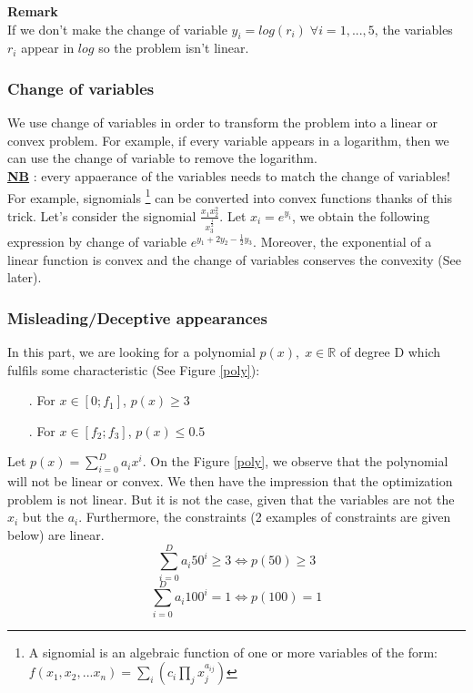 \documentclass{article}
\begin{document}
\textbf{Remark}\\
If we don't make the change of variable $y_i = log(r_i) \; \forall i=1,...,5$,  the variables $r_i$ appear in $log$ so the problem isn't linear.

\subsubsection{Change of variables}

We use change of variables in order to transform the problem into a linear or convex problem. For example, if every variable appears in a logarithm, then we can use the change of variable to remove the logarithm.\\ \underline{\textbf{NB}} : every appaerance of the variables needs to match the change of variables! \\

For example, signomials \footnote{A signomial is an algebraic function of one or more variables of the form:\\ $f(x_1,x_2,...x_n) = \sum_i{(c_i\prod_j{x_j^{a_{ij}}})}$} can be converted into convex functions thanks of this trick. Let's consider the signomial $\frac{x_1x_2^2}{x_3^{\frac{1}{2}}}$. Let $x_i = e^{y_i}$, we obtain the following expression by change of variable $e^{y_1+2y_2-\frac{1}{2}y_3}$. Moreover, the exponential of a linear function is convex and the change of variables conserves the convexity (See later).

\subsubsection{Misleading/Deceptive appearances}

In this part, we are looking for a polynomial $p(x), \; x \in \mathbb{R}$ of degree D which fulfils some characteristic (See Figure \ref{poly}): 
\begin{itemize}
\item[.]{For $x \in \left[0;f_1\right]$, $p(x) \geq 3$}
\item[.]{For $x \in \left[f_2;f_3\right]$, $p(x) \leq 0.5$} \\
\end{itemize}

Let $p(x) = \sum_{i=0}^{D} a_i x^{i}$.
On the Figure \ref{poly}, we observe that the polynomial will not be linear or convex. We then have the impression that the optimization problem is not linear. But it is not the case, given that the variables are not the $x_i$ but the $a_i$.
Furthermore, the constraints (2 examples of constraints are given below) are linear. 
$$ \sum_{i=0}^{D} a_i 50^{i} \geq 3 \Leftrightarrow p(50) \geq 3$$
$$ \sum_{i=0}^{D} a_i 100^{i} = 1 \Leftrightarrow p(100)=1$$
\end{document}
